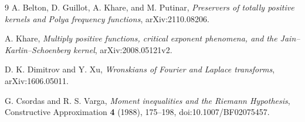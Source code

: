 \begin{thebibliography}{9}
A. Belton, D. Guillot, A. Khare, and M. Putinar,
\emph{Preservers of totally positive kernels and Polya frequency functions},
arXiv:2110.08206.

A. Khare,
\emph{Multiply positive functions, critical exponent phenomena, and the
Jain--Karlin--Schoenberg kernel},
arXiv:2008.05121v2.

D. K. Dimitrov and Y. Xu,
\emph{Wronskians of Fourier and Laplace transforms},
arXiv:1606.05011.

G. Csordas and R. S. Varga,
\emph{Moment inequalities and the Riemann Hypothesis},
Constructive Approximation \textbf{4} (1988), 175--198,
doi:10.1007/BF02075457.
\end{thebibliography}
